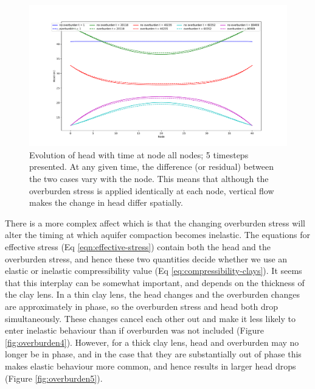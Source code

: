 \documentclass{article}
\begin{document}
\begin{figure}
\includegraphics[width=\linewidth]{BasicIllustration_Timeevolution.pdf}
\caption{Evolution of head with time at node all nodes; 5 timesteps presented. At any given time, the difference (or residual) between the two cases vary with the node. This means that although the overburden stress is applied identically at each node, vertical flow makes the change in head differ spatially.}
\label{fig:overburden3}
\end{figure}

There is a more complex affect which is that the changing overburden stress will alter the timing at which aquifer compaction becomes inelastic. The equations for effective stress (Eq \ref{eqn:effective-stress}) contain both the head and the overburden stress, and hence these two quantities decide whether we use an elastic or inelastic compressibility value (Eq \ref{eq:compressibility-clays}). It seems that this interplay can be somewhat important, and depends on the thickness of the clay lens. In a thin clay lens, the head changes and the overburden changes are approximately in phase, so the overburden stress and head both drop simultaneously. These changes cancel each other out and make it less likely to enter inelastic behaviour than if overburden was not included (Figure \ref{fig:overburden4}). However, for a thick clay lens, head and overburden may no longer be in phase, and in the case that they are substantially out of phase this makes elastic behaviour more common, and hence results in larger head drops (Figure \ref{fig:overburden5}).
\end{document}

